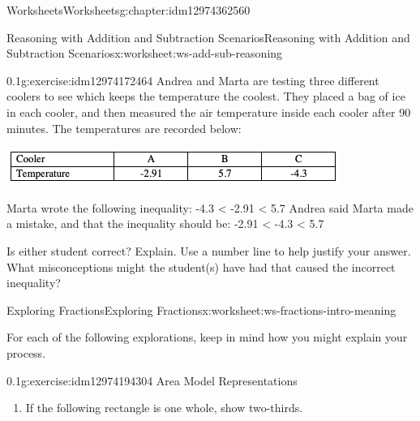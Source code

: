 \documentclass[twoside,11pt,]{book}
\begin{document}
\begin{chapterptx}{Worksheets}{}{Worksheets}{}{}{g:chapter:idm12974362560}
\begin{worksheet-section-numberless}{Reasoning with Addition and Subtraction Scenarios}{}{Reasoning with Addition and Subtraction Scenarios}{}{}{x:worksheet:ws-add-sub-reasoning}
\clearpage
\begin{divisionexercise}{6}{}{0.1}{g:exercise:idm12974172464}%
Andrea and Marta are testing three different coolers to see which keeps the temperature the coolest.  They placed a bag of ice in each cooler, and then measured the air temperature inside each cooler after 90 minutes.  The temperatures are recorded below:%
\begin{image}{0}{1}{0}%
\includegraphics[width=1\linewidth]{images/reasoning-table-cooler.png}
\end{image}%
Marta wrote the following inequality: -4.3 \textless{}  -2.91 \textless{} 5.7 Andrea said Marta made a mistake, and that the inequality should be: -2.91 \textless{} -4.3 \textless{} 5.7%
\par
Is either student correct?  Explain.  Use a number line to help justify your answer.  What misconceptions might the student(s) have had that caused the incorrect inequality?%
\end{divisionexercise}%
\end{worksheet-section-numberless}
\restoregeometry
%
%
\typeout{************************************************}
\typeout{************************************************}
%
\begin{worksheet-section-numberless}{Exploring Fractions}{}{Exploring Fractions}{}{}{x:worksheet:ws-fractions-intro-meaning}
\begin{introduction}{}%
For each of the following explorations, keep in mind how you might explain your process.%
\end{introduction}%
\begin{divisionexercise}{1}{}{0.1}{g:exercise:idm12974194304}%
Area Model Representations%
%
\begin{enumerate}[label=(\alph*)]
\item{}If the following rectangle is one whole, show two-thirds. \begin{sidebyside}{1}{0.3}{0.3}{0}%
\begin{sbspanel}{0.4}%

\end{sbspanel}
\end{sidebyside}
\end{enumerate}
\end{divisionexercise}
\end{worksheet-section-numberless}
\end{chapterptx}
\end{document}
